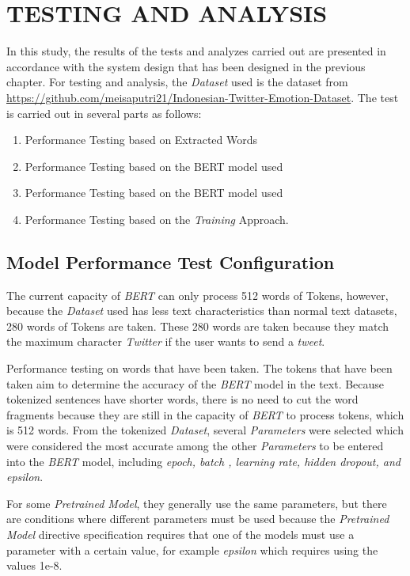 \section{TESTING AND ANALYSIS}
\label{sec:pengujiananalisa}

In this study, the results of the tests and analyzes carried out are presented in accordance with the system design that has been designed in the previous chapter. For testing and analysis, the \textit{Dataset} used is the dataset from \url{https://github.com/meisaputri21/Indonesian-Twitter-Emotion-Dataset}. The test is carried out in several parts as follows:

\begin{enumerate}[nolistsep]
    \item Performance Testing based on Extracted Words
    \item Performance Testing based on the BERT model used
    \item Performance Testing based on the BERT model used
    \item Performance Testing based on the \textit{Training} Approach.
\end{enumerate}

\subsection{Model Performance Test Configuration}

The current capacity of \textit{BERT} can only process 512 words of Tokens, however, because the \textit{Dataset} used has less text characteristics than normal text datasets, 280 words of Tokens are taken. These 280 words are taken because they match the maximum character \textit{Twitter} if the user wants to send a \textit{tweet}.

Performance testing on words that have been taken. The tokens that have been taken aim to determine the accuracy of the \textit{BERT} model in the text. Because tokenized sentences have shorter words, there is no need to cut the word fragments because they are still in the capacity of \textit{BERT} to process tokens, which is 512 words. From the tokenized \textit{Dataset}, several \textit{Parameters} were selected which were considered the most accurate among the other \textit{Parameters} to be entered into the \textit{BERT} model, including \textit{epoch, batch , learning rate, hidden dropout, and epsilon}.

For some \textit{Pretrained Model}, they generally use the same parameters, but there are conditions where different parameters must be used because the \textit{Pretrained Model} directive specification requires that one of the models must use a parameter with a certain value, for example \textit {epsilon} which requires using the values 1e-8.

